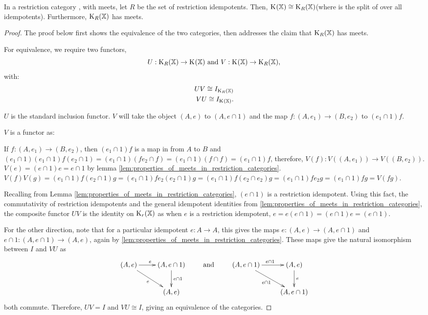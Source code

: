 \begin{proposition}\label{pro:in_rc_x_with_meets_split_x_is_cong_to_split_r_x}
  In a restriction category \X, with meets, let $R$ be the set of restriction idempotents.
  Then, $\text{K}_{}(\mathbb{X}) \cong \text{K}_{R}(\mathbb{X})$(where \spl{}{\X} is the split of \X over all idempotents).
  Furthermore, $\text{K}_{R}(\mathbb{X})$ has meets.
\end{proposition}
\begin{proof}
  The proof below first shows the equivalence of the two categories, then addresses the claim
  that $\text{K}_{R}(\mathbb{X})$ has meets.

  For equivalence, we require two functors,
  \[
    U:\text{K}_{R}(\mathbb{X})\to\text{K}_{}(\mathbb{X})\text{ and }V:\text{K}_{}(\mathbb{X})\to\text{K}_{R}(\mathbb{X}),
  \]
  with:
  \begin{align}
    U V \cong I_{\text{K}_{R}(\mathbb{X})}\\
    V U \cong I_{\text{K}_{}(\mathbb{X})}.
  \end{align}


  $U$ is the standard inclusion functor. $V$ will take the object $(A,e)$ to
  $(A,e\cap 1)$ and the map $f:(A,e_1)\to (B,e_2)$ to $(e_1\cap 1)f $.

  $V$ is a functor as:
  \begin{description}
     If  $f:(A,e_1) \to (B,e_2)$, then
      $(e_1\cap 1) f $ is a map in \X from $A$ to $B$ and
      $ (e_1\cap 1)(e_1\cap 1) f  (e_2 \cap 1) =
      (e_1\cap 1) (f  e_2 \cap f ) = (e_1\cap 1) (f \cap f)= (e_1\cap 1) f$, therefore,
      $V(f):V((A,e_1)) \to V((B,e_2))$.
     $V(e) = (e\cap 1 ) e = e \cap 1$ by
      lemma \vref{lem:properties_of_meets_in_restriction_categories}.
     $V(f) V(g)
      = (e_1\cap 1 ) f (e_2 \cap 1) g
      = (e_1\cap 1 ) f e_2 (e_2 \cap 1) g
      = (e_1\cap 1 ) f  (e_2 \cap e_{2}) g
      = (e_1\cap 1 ) f e_2 g
      = (e_1\cap 1 ) f g
      = V(f g)$.
  \end{description}

  Recalling from Lemma \vref{lem:properties_of_meets_in_restriction_categories}, $(e\cap 1)$
  is a restriction idempotent. Using this fact, the commutativity of restriction idempotents
  and the general idempotent identities from
  \vref{lem:properties_of_meets_in_restriction_categories}, the composite functor $U V$ is
  the identity on $\text{K}_{r}(\mathbb{X})$ as when $e$ is a restriction idempotent,
  $e = e (e\cap 1) = (e\cap 1) e = (e\cap 1)$.

  For the other direction,  note that for a particular idempotent $e:A\to A$,  this gives the
  maps $e:(A,e)\to(A,e\cap 1)$ and $e\cap 1 : (A,e\cap 1) \to (A,e)$, again by
  \vref{lem:properties_of_meets_in_restriction_categories}. These maps give the natural
  isomorphism between $I$ and $V U$ as
  \[
    \xymatrix{
      (A,e)\ar[r]^e \ar[dr]_{e} &(A,e\cap 1)\ar[d]^{e\cap 1}\\
      &(A,e)
    }\qquad \text{ and  }\qquad
    \xymatrix{
      (A,e\cap 1)\ar[r]^{e\cap 1} \ar[dr]_{e\cap 1} &(A,e)\ar[d]^{e}\\
      &(A,e\cap 1)
    }
  \]
  both commute. Therefore, $U V = I$ and $V U \cong I$, giving an equivalence of the categories.


\end{proof}
